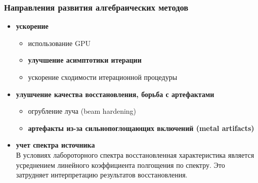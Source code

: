 \begin{frame}
\frametitle{Направления развития алгебраических методов}

\begin{itemize}
  \item \textbf{ускорение}
  \begin{itemize}
    \item использование GPU
    \item \textbf{улучшение асимптотики итерации}
    \item ускорение сходимости итерационной процедуры
  \end{itemize}
  \item \textbf{улушчение качества восстановления, борьба с артефактами}
    \begin{itemize}
    \item огрубление луча (beam hardening)
    \item \textbf{артефакты из-за сильнопоглощающих включений (metal artifacts)}
    \end{itemize}
  \item \textbf{учет спектра источника} \\
  \small{В условиях лабороторного спектра восстановленная характеристика является усреднением линейного коэффициента полгощения по спектру. Это затрудняет интерпретацию результатов восстановления. }
\end{itemize}

\end{frame}